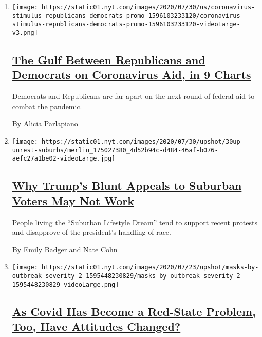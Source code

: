 \begin{enumerate}
\def\labelenumi{\arabic{enumi}.}
\item
  \texttt{[image: https://static01.nyt.com/images/2020/07/30/us/coronavirus-stimulus-republicans-democrats-promo-1596103233120/coronavirus-stimulus-republicans-democrats-promo-1596103233120-videoLarge-v3.png]}

  \hypertarget{the-gulf-between-republicans-and-democrats-on-coronavirus-aid-in-9-charts}{%
  \subsection{\texorpdfstring{\href{/interactive/2020/07/30/upshot/coronavirus-stimulus-bill.html}{The
  Gulf Between Republicans and Democrats on Coronavirus Aid, in 9
  Charts}}{The Gulf Between Republicans and Democrats on Coronavirus Aid, in 9 Charts}}\label{the-gulf-between-republicans-and-democrats-on-coronavirus-aid-in-9-charts}}

  Democrats and Republicans are far apart on the next round of federal
  aid to combat the pandemic.

  By Alicia Parlapiano
\item
  \texttt{[image: https://static01.nyt.com/images/2020/07/30/upshot/30up-unrest-suburbs/merlin\_175027380\_4d52b94c-d484-46af-b076-aefc27a1be02-videoLarge.jpg]}

  \hypertarget{why-trumps-blunt-appeals-to-suburban-voters-may-not-work}{%
  \subsection{\texorpdfstring{\href{/2020/07/30/upshot/trump-suburban-voters.html}{Why
  Trump's Blunt Appeals to Suburban Voters May Not
  Work}}{Why Trump's Blunt Appeals to Suburban Voters May Not Work}}\label{why-trumps-blunt-appeals-to-suburban-voters-may-not-work}}

  People living the ``Suburban Lifestyle Dream'' tend to support recent
  protests and disapprove of the president's handling of race.

  By Emily Badger and Nate Cohn
\item
  \texttt{[image: https://static01.nyt.com/images/2020/07/23/upshot/masks-by-outbreak-severity-2-1595448230829/masks-by-outbreak-severity-2-1595448230829-videoLarge.png]}

  \hypertarget{as-covid-has-become-a-red-state-problem-too-have-attitudes-changed}{%
  \subsection{\texorpdfstring{\href{/2020/07/30/upshot/coronavirus-republican-voting.html}{As
  Covid Has Become a Red-State Problem, Too, Have Attitudes
  Changed?}}{As Covid Has Become a Red-State Problem, Too, Have Attitudes Changed?}}\label{as-covid-has-become-a-red-state-problem-too-have-attitudes-changed}}


\end{enumerate}
